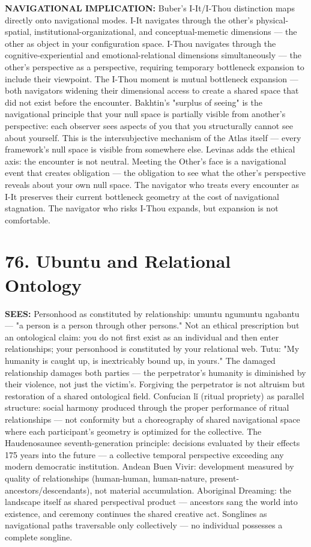 \textbf{NAVIGATIONAL IMPLICATION:} Buber's I-It/I-Thou distinction maps directly onto navigational modes. I-It navigates through the other's physical-spatial, institutional-organizational, and conceptual-memetic dimensions — the other as object in your configuration space. I-Thou navigates through the cognitive-experiential and emotional-relational dimensions simultaneously — the other's perspective as a perspective, requiring temporary bottleneck expansion to include their viewpoint. The I-Thou moment is mutual bottleneck expansion — both navigators widening their dimensional access to create a shared space that did not exist before the encounter. Bakhtin's "surplus of seeing" is the navigational principle that your null space is partially visible from another's perspective: each observer sees aspects of you that you structurally cannot see about yourself. This is the intersubjective mechanism of the Atlas itself — every framework's null space is visible from somewhere else. Levinas adds the ethical axis: the encounter is not neutral. Meeting the Other's face is a navigational event that creates obligation — the obligation to see what the other's perspective reveals about your own null space. The navigator who treats every encounter as I-It preserves their current bottleneck geometry at the cost of navigational stagnation. The navigator who risks I-Thou expands, but expansion is not comfortable.


\bigskip\noindent\makebox[\textwidth]{\color{rulegray}\rule{5cm}{0.3pt}}\bigskip


\section*{76. Ubuntu and Relational Ontology}


\textbf{SEES:} Personhood as constituted by relationship: umuntu ngumuntu ngabantu — "a person is a person through other persons." Not an ethical prescription but an ontological claim: you do not first exist as an individual and then enter relationships; your personhood is constituted by your relational web. Tutu: "My humanity is caught up, is inextricably bound up, in yours." The damaged relationship damages both parties — the perpetrator's humanity is diminished by their violence, not just the victim's. Forgiving the perpetrator is not altruism but restoration of a shared ontological field. Confucian l\v{i} (ritual propriety) as parallel structure: social harmony produced through the proper performance of ritual relationships — not conformity but a choreography of shared navigational space where each participant's geometry is optimized for the collective. The Haudenosaunee seventh-generation principle: decisions evaluated by their effects 175 years into the future — a collective temporal perspective exceeding any modern democratic institution. Andean Buen Vivir: development measured by quality of relationships (human-human, human-nature, present-ancestors/descendants), not material accumulation. Aboriginal Dreaming: the landscape itself as shared perspectival product — ancestors sang the world into existence, and ceremony continues the shared creative act. Songlines as navigational paths traversable only collectively — no individual possesses a complete songline.


